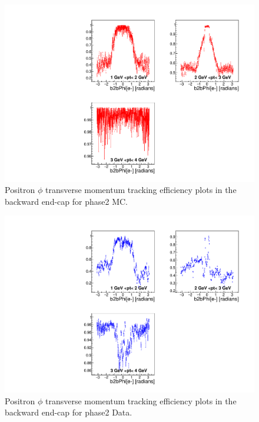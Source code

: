 \documentclass[a4paper,11pt,twosided,final,german,openbib,pdftex,listof=totoc,bibliography=totoc]{scrbook}
\begin{document}
\begin{appendix}


\clearpage


\begin{figure}[!htbp]
	\centering
	\includegraphics[width=\textwidth]{Plots/master/xPtMPhiepEC_MC}
	\caption[Transverse Momentum $\phi$ Positron Backward End-Cap Efficiency Phase2 MC]{Positron $\phi$ transverse momentum tracking efficiency plots in the backward end-cap for phase2 MC.}
	\label{plt:PtMPhiepEC_MC}
\end{figure}


\begin{figure}[!htbp]
	\centering
	\includegraphics[width=\textwidth]{Plots/master/xPtMPhiepEC_Data}
	\caption[Transverse Momentum $\phi$ Positron Backward End-Cap Efficiency Phase2 Data]{Positron $\phi$ transverse momentum tracking efficiency plots in the backward end-cap for phase2 Data.}
	\label{plt:PtMPhiepEC_Data}
\end{figure}




\end{appendix}
\end{document}
